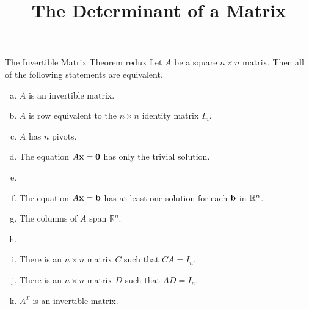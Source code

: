 \documentclass[xcolor=dvipsnames,aspectratio=169,t]{beamer}
\title{The Determinant of a Matrix}
\begin{document}
\maketitle

\begin{frame}{The Invertible Matrix Theorem redux}
  Let $A$ be a square $n \times n$ matrix. Then all of the following statements are \alert{equivalent}.
  \medskip
  
  \begin{enumerate}[(a)]
    \item \alert{$A$ is an invertible matrix.}
    \item $A$ is row equivalent to the $n \times n$ identity matrix $I_n$.
    \item $A$ has $n$ pivots.
    \item The equation $A\mathbf{x}=\mathbf{0}$ has only the trivial solution.
    \item {}
    \addtocounter{enumi}{2}
    \item The equation $A\mathbf{x}=\mathbf{b}$ has at least one solution for each $\mathbf{b}$ in $\mathbb{R}^n$.
    \item The columns of $A$ span $\mathbb{R}^n$.
    \item {}
    \addtocounter{enumi}{1}
    \item There is an $n \times n$ matrix $C$ such that $CA = I_n$.
    \item There is an $n \times n$ matrix $D$ such that $AD = I_n$.
    \item $A^T$ is an invertible matrix.
  \end{enumerate}
\end{frame}
\end{document}
